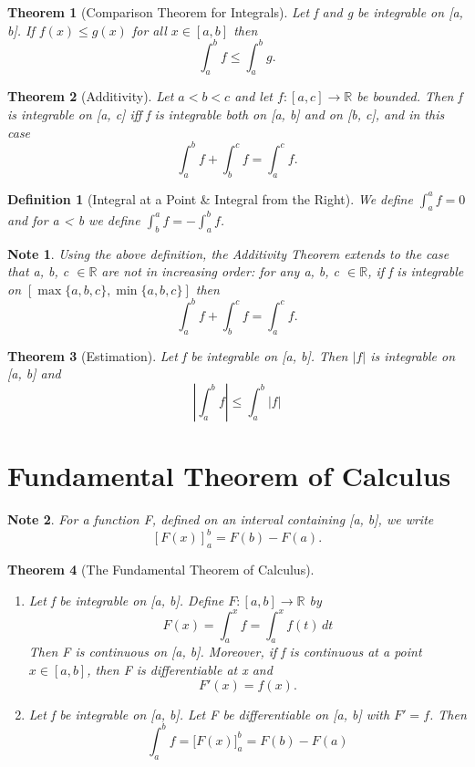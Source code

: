 \documentclass[11pt, oneside]{book}
\theoremstyle{break}
\newtheorem{thm}{Theorem}[section]
\newtheorem*{note}{Note}
\newtheorem{defn}{Definition}[section]
\newcommand{\bb}[1]{\mathbb{#1}}			%
\begin{document}
\begin{thm}[Comparison Theorem for Integrals]
	Let f and g be integrable on [a, b]. If $f(x) \leq g(x)$ for all $x \in [a, b]$ then
	\[
		\int_{a}^{b} f \leq \int_{a}^{b} g.
	\]
\end{thm}

\begin{thm}[Additivity]
	Let $a < b < c$ and let $f: [a, c] \to \bb{R}$ be bounded. Then f is integrable on [a, c] iff f is integrable both on [a, b] and on [b, c], and in this case
	\[
		\int_{a}^{b} f + \int_{b}^{c} f = \int_{a}^{c} f.
	\]
\end{thm}

\begin{defn}[Integral at a Point \& Integral from the Right]
	We define $\int_{a}^{a} f = 0$ and for a < b we define $\int_{b}^{a} f = -\int_{a}^{b} f$.
\end{defn}

\begin{note}
	Using the above definition, the Additivity Theorem extends to the case that a, b, c $\in \bb{R}$ are not in increasing order: for any a, b, c $\in \bb{R}$, if f is integrable on $[\max \{a, b, c\}, \min \{a, b, c\}]$ then
	\[
		\int_{a}^{b} f + \int_{b}^{c} f = \int_{a}^{c} f.
	\]
\end{note}

\begin{thm}[Estimation]
	Let f be integrable on [a, b]. Then $|f|$ is integrable on [a, b] and
	\[
		\left|\int_{a}^{b} f \right| \leq \int_{a}^{b} |f|
	\]
\end{thm}


\section{Fundamental Theorem of Calculus}

\begin{note}
	For a function F, defined on an interval containing [a, b], we write
	\[
		[F(x)]_a^b = F(b) - F(a).
	\]
\end{note}

\begin{thm}[The Fundamental Theorem of Calculus]
	\begin{enumerate}
		\item Let f be integrable on [a, b]. Define $F: [a, b] \to \bb{R}$ by
			\[
				F(x) = \int_{a}^{x} f = \int_{a}^{x} f(t) \, dt
			\]
			Then F is continuous on [a, b]. Moreover, if f is continuous at a point $x \in [a, b]$, then F is differentiable at x and
			\[
				F'(x) = f(x).
			\]
		\item Let f be integrable on [a, b]. Let F be differentiable on [a, b] with $F' = f$. Then
			\[
				\int_{a}^{b} f = \lbrack F(x) \rbrack_a^b = F(b) - F(a)
			\]
	\end{enumerate}
\end{thm}
\end{document}
